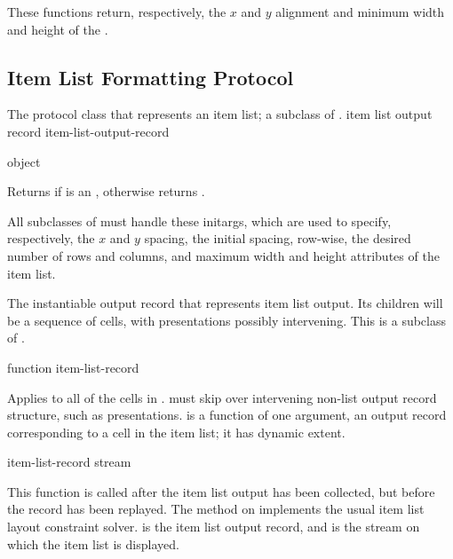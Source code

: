 These functions return, respectively, the $x$ and $y$ alignment and minimum
width and height of the  .


\subsection {Item List Formatting Protocol}


The protocol class that represents an item list; a subclass of
.
 {item list output record} {item-list-output-record}

 {object}

Returns  if  is an ,
otherwise returns .


All subclasses of  must handle these initargs, which
are used to specify, respectively, the $x$ and $y$ spacing, the initial spacing,
row-wise, the desired number of rows and columns, and maximum width and height
attributes of the item list.


The instantiable output record that represents item list output.  Its children
will be a sequence of cells, with presentations possibly intervening.  This is a
subclass of .

 {function item-list-record}

Applies  to all of the cells in .
 must skip over intervening non-list output record
structure, such as presentations.   is a function of one argument,
an output record corresponding to a cell in the item list; it has dynamic
extent.

 {item-list-record stream}

This function is called after the item list output has been collected, but
before the record has been replayed.  The method on
 implements the usual item list layout
constraint solver.   is the item list output record, and
 is the stream on which the item list is displayed.
